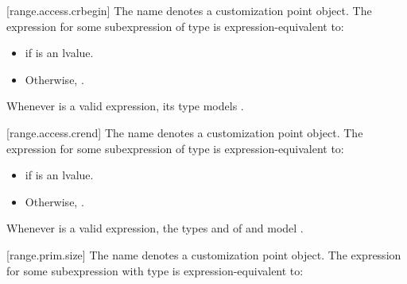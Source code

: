 [range.access.crbegin]{}
\pnum
The name  denotes a customization point
object. The expression
 for some subexpression  of type
 is expression-equivalent to:
\begin{itemize}
\item {} if  is
  an lvalue.
\item Otherwise, .
\end{itemize}

\pnum
\begin{note}
Whenever  is a valid expression, its
type models .
\end{note}

[range.access.crend]{}
\pnum
The name  denotes a customization point
object. The expression
 for some subexpression  of type 
is expression-equivalent to:
\begin{itemize}
\item {} if  is an lvalue.

\item Otherwise, .
\end{itemize}

\pnum
\begin{note}
Whenever  is a valid expression,
the types  and  of
 and 
model .
\end{note}

[range.prim.size]{}
\pnum
The name  denotes a customization point
object. The expression
 for some subexpression  with type
 is expression-equivalent to:

